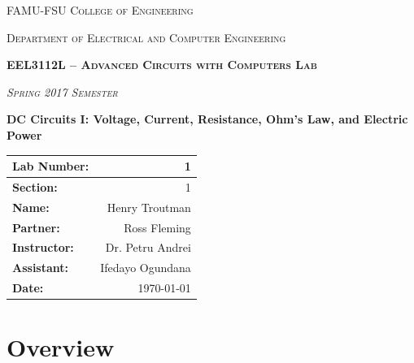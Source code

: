 \documentclass{article}
\begin{document}

      \begin{titlepage}
    \centering
    	{\scshape\LARGE FAMU-FSU College of Engineering \par}
    	\vspace{0.75cm}
    	{\scshape\large Department of Electrical and Computer Engineering\par}
    	\vspace{0.25cm}
      {\scshape\large\bfseries EEL3112L – Advanced Circuits with Computers Lab  \par}
      \vspace{0.25cm}
    	{\scshape\large \textit{ Spring 2017 Semester} \par}
    	\vspace{1.2cm}
      {\Large\bfseries DC Circuits I: Voltage, Current, Resistance, Ohm’s Law, and Electric Power \par}
      \vspace{1cm}
      \vfill
      \def\arraystretch{2.5}
      \begin{tabular}{  l  r  }
        \hline

          {\large\textbf{Lab Number:} }  & { \large 1 } \\ \hline
          {\large\textbf{Section:} }  & { \large 1 } \\ \hline
          {\large\textbf{Name:} }  & { \large Henry Troutman } \\ \hline
          {\large\textbf{Partner:} }  & { \large Ross Fleming } \\ \hline
          {\large\textbf{Instructor:} }  & { \large Dr. Petru Andrei } \\ \hline
          {\large\textbf{Assistant:} }  & { \large Ifedayo Ogundana } \\ \hline
          {\large\textbf{Date:} }  & { \large \today } \\ \hline

        \end{tabular}
        \vspace{3cm}

  \end{titlepage}


        \clearpage
    \newpage
    \tableofcontents
    \listoftables
    \listoffigures
    \newpage
    
  \section{Overview}
  \label{sec:Overview}
    \clearpage
\end{document}
